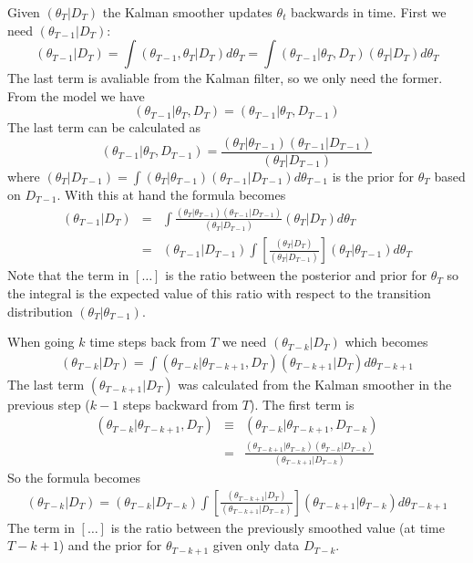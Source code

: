 Given $(\theta_T|D_T)$ the Kalman smoother updates
$\theta_t$ backwards in time. First we need $(\theta_{T-1}|D_T)$:
$$
(\theta_{T-1}|D_T) 
=
\int(\theta_{T-1},\theta_T|D_T) d\theta_T
=
\int (\theta_{T-1}|\theta_T,D_T)(\theta_{T}|D_T)  d\theta_T
$$
The last term is avaliable from the Kalman filter, so we
only need the former. From the model we have
$$
(\theta_{T-1}|\theta_T,D_T) = (\theta_{T-1}|\theta_T,D_{T-1})
$$
The last term can be calculated as
$$
(\theta_{T-1}|\theta_T,D_{T-1}) =
\frac{(\theta_T|\theta_{T-1})(\theta_{T-1}|D_{T-1})}{(\theta_T|D_{T-1})}
$$
where $(\theta_T|D_{T-1})=
\int (\theta_T|\theta_{T-1})(\theta_{T-1}|D_{T-1})
d\theta_{T-1}$ is the prior for $\theta_T$ based on
$D_{T-1}$. With this at hand the formula becomes
\begin{eqnarray*}
(\theta_{T-1}|D_T) 
&=&
\int \frac{(\theta_T|\theta_{T-1})(\theta_{T-1}|D_{T-1})}{(\theta_T|D_{T-1})}
(\theta_{T}|D_T)  d\theta_T\\
&=&
(\theta_{T-1}|D_{T-1})
\int \left[\frac{(\theta_{T}|D_T)}{(\theta_T|D_{T-1})}\right]
(\theta_T|\theta_{T-1})  d\theta_T
  \end{eqnarray*}
Note that the term in $[\dots]$ is the ratio between the
posterior and prior for $\theta_T$ so the integral is the
expected value of this ratio with respect to the transition
distribution $(\theta_T|\theta_{T-1})$.

When going $k$ time steps back from $T$ we need
$(\theta_{T-k}|D_T)$ which becomes
\begin{eqnarray*}
  (\theta_{T-k}|D_T) = \int (\theta_{T-k}|\theta_{T-k+1},
  D_T) 
(\theta_{T-k+1}|D_T)d\theta_{T-k+1}
\end{eqnarray*}
The last term $(\theta_{T-k+1}|D_T)$ was calculated from the
Kalman smoother in the previous step ($k-1$ steps backward
from $T$). The first term is
\begin{eqnarray*}
(\theta_{T-k}|\theta_{T-k+1}, D_T) &\equiv&
   (\theta_{T-k}|\theta_{T-k+1}, D_{T-k})\\
&=&
\frac{(\theta_{T-k+1}|\theta_{T-k})(\theta_{T-k}|D_{T-k})}
{(\theta_{T-k+1}|D_{T-k})}
\end{eqnarray*}
So the formula becomes
\begin{eqnarray*}
(\theta_{T-k}|D_T) = (\theta_{T-k}|D_{T-k}) \int 
\left[\frac{(\theta_{T-k+1}|D_T)}
{(\theta_{T-k+1}|D_{T-k})}\right]
(\theta_{T-k+1}|\theta_{T-k})d\theta_{T-k+1}  
\end{eqnarray*}
The term in $[\dots]$ is the ratio between the previously
smoothed value (at time $T-k+1$) and the prior for
$\theta_{T-k+1}$ given only data $D_{T-k}$. 

